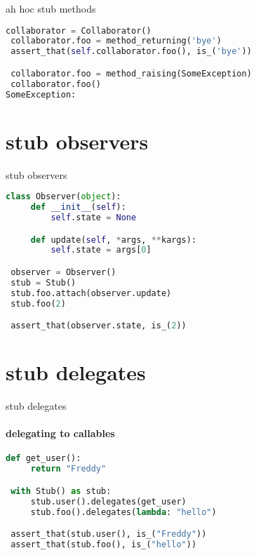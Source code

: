 \documentclass[11pt]{beamer}
\begin{document}
\begin{frame}[fragile]{ah hoc stub methods}

\begin{exampleblock}{}
\begin{lstlisting}[language=Python]
 collaborator = Collaborator()
 collaborator.foo = method_returning('bye')
 assert_that(self.collaborator.foo(), is_('bye'))

 collaborator.foo = method_raising(SomeException)
 collaborator.foo()
SomeException:
\end{lstlisting}
\end{exampleblock}
\end{frame}

\section{stub observers}

\begin{frame}[fragile]{stub observers}

\begin{exampleblock}{}
\begin{lstlisting}[language=Python]
 class Observer(object):
     def __init__(self):
         self.state = None

     def update(self, *args, **kargs):
         self.state = args[0]

 observer = Observer()
 stub = Stub()
 stub.foo.attach(observer.update)
 stub.foo(2)

 assert_that(observer.state, is_(2))
\end{lstlisting}
\end{exampleblock}
\end{frame}

\section{stub delegates}

\begin{frame}[fragile]{stub delegates}
\framesubtitle{delegating to callables}

\begin{exampleblock}{}
\begin{lstlisting}[language=Python]
 def get_user():
     return "Freddy"

 with Stub() as stub:
     stub.user().delegates(get_user)
     stub.foo().delegates(lambda: "hello")

 assert_that(stub.user(), is_("Freddy"))
 assert_that(stub.foo(), is_("hello"))
\end{lstlisting}
\end{exampleblock}
\end{frame}
\end{document}
